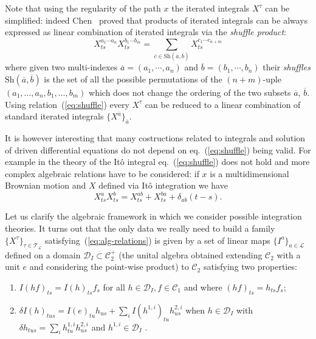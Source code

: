 \documentclass[a4paper]{article}
\newcommand{\ol}[1]{\overline{#1}}
\newcommand{\1}{{\bf 1}}
\newcommand{\der}{\delta}
\newcommand{\CC}{\mathcal{C}}
\newcommand{\DD}{\mathcal{D}}
\newcommand{\LL}{\mathcal{L}}
\newcommand{\TT}{\mathcal{T}}
\newcommand{\CC}{\mathcal{C}}
\newcommand{\der}{\delta}
\begin{document}
Note that using the regularity of the path $x$ the iterated integrals
$X^{\tau}$ can be simplified: indeed Chen~\cite{MR0454968} proved that
products of iterated integrals can be always expressed as linear
combination of iterated integrals via the \emph{shuffle product}:
\begin{equation}
  \label{eq:shuffle}
X^{a_1 \cdots a_n }_{ts}  X^{b_1 \cdots b_m}_{ts} =
\sum_{\overline c \in \text{Sh}(\overline a, \overline b)}
X^{c_1\cdots c_{n+m}}_{ts}  
\end{equation}
where given two multi-indexes $\overline a = (a_1,\cdots, a_n)$ and
$\overline b = (b_1, \cdots, b_n)$ their \emph{shuffles} $\text{Sh}(\overline a, \overline b)$ is the set of all the possible permutations of the $(n+m)$-uple $(a_1,\dots,a_n,b_1,\dots,b_m)$ which does not change the ordering of the two subsets $\overline a$, $\overline b$.
Using relation~(\ref{eq:shuffle}) every $X^{\tau}$ can be reduced to a linear combination of standard iterated
integrals $\{ X^{\ol a}
\}_{\ol a}$. 

\bigskip
It is however interesting that many costructions related to integrals
and solution of driven differential equations do not depend on
eq.~(\ref{eq:shuffle}) being valid. For example in the theory of the
It\^o integral eq.~(\ref{eq:shuffle}) does not hold and more complex
algebraic relations have to be considered: if $x$ is a multidimensional
Brownian motion and $X$ defined via It\^o integration we have
$$
X^a_{ts} X^b_{ts} = X^{ab}_{ts}+X^{ba}_{ts} + \delta_{ab} (t-s).
$$

\bigskip

Let us clarify the algebraic framework in which we consider possible
integration theories.
It turns out that the only data we really need to build a family
$\{X^\tau\}_{\tau \in \TT_\LL}$ satisfying~(\ref{eq:alg-relations}) is
given by a set of linear maps $\{I^a\}_{a \in
  \LL}$ defined on a domain $\DD_I \subset \CC^+_2$ (the unital
algebra obtained extending $\CC_2$ with a unit $e$ and considering the point-wise
product) to $\CC_2$ satisfying two properties:
\begin{enumerate}
\item 
$
I(hf)_{ts} =  I(h)_{ts} f_s$ for all $ h \in \DD_I, f \in \CC_1
$ and
where $(hf)_{ts} = h_{ts} f_s$;
\item
$
\der I(h)_{tus} = I(e)_{tu}h_{us} + \sum_i I(h^{1,i})_{tu} h^{2,i}_{us}$ when $h\in
  \DD_I$ with $ \der h_{tus} = \sum_i h^{1,i}_{tu} h^{2,i}_{us}$ and $h^{1,i} \in \DD_I$ .
\end{enumerate}
 
\end{document}
